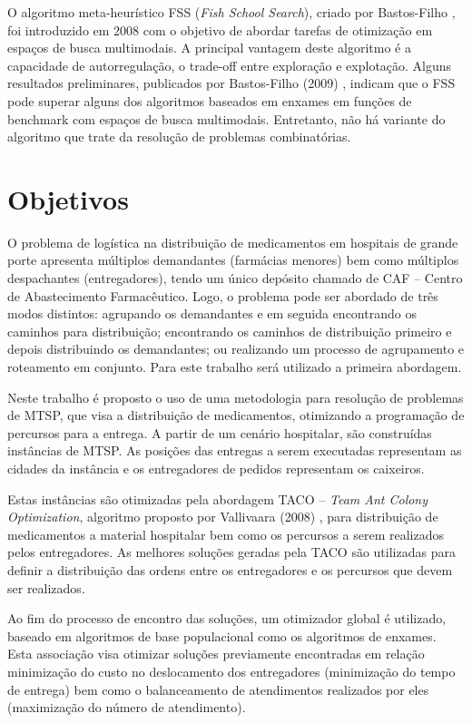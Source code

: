 O algoritmo meta-heurístico FSS (\textit{Fish School Search}), criado por Bastos-Filho \cite{bastos2008novel}, foi introduzido em 2008 com o objetivo de abordar tarefas de otimização em espaços de busca multimodais. A principal vantagem deste algoritmo é a capacidade de autorregulação, o trade-off entre exploração e explotação. Alguns resultados preliminares, publicados por Bastos-Filho (2009) \cite{bastos2009fish}, indicam que o FSS pode superar alguns dos algoritmos baseados em enxames em funções de benchmark com espaços de busca multimodais. Entretanto, não há variante do algoritmo que trate da resolução de problemas combinatórias.

\section{Objetivos}
\label{sec-objetivos}

O problema de logística na distribuição de medicamentos em hospitais de grande porte apresenta múltiplos demandantes (farmácias menores) bem como múltiplos despachantes (entregadores), tendo um único depósito chamado de CAF – Centro de Abastecimento Farmacêutico. Logo, o problema pode ser abordado de três modos distintos: agrupando os demandantes e em seguida encontrando os caminhos para distribuição; encontrando os caminhos de distribuição primeiro e depois distribuindo os demandantes; ou realizando um processo de agrupamento e roteamento em conjunto. Para este trabalho será utilizado a primeira abordagem. %

Neste trabalho é proposto o uso de uma metodologia para resolução de problemas de MTSP, que visa a distribuição de medicamentos, otimizando a programação de percursos para a entrega. A partir de um cenário hospitalar, são construídas instâncias de MTSP. As posições das entregas a serem executadas representam as cidades da instância e os entregadores de pedidos representam os caixeiros.

Estas instâncias são otimizadas pela abordagem TACO – \textit{Team Ant Colony Optimization}, algoritmo proposto por Vallivaara (2008) \cite{vallivaara2008team}, para distribuição de medicamentos a material hospitalar bem como os percursos a serem realizados pelos entregadores. As melhores soluções geradas pela TACO são utilizadas para definir a distribuição das ordens entre os entregadores e os percursos que devem ser realizados.

Ao fim do processo de encontro das soluções, um otimizador global é utilizado, baseado em algoritmos de base populacional como os algoritmos de enxames. Esta associação visa otimizar soluções previamente encontradas em relação minimização do custo no deslocamento dos entregadores (minimização do tempo de entrega) bem como o balanceamento de atendimentos realizados por eles (maximização do número de atendimento).

